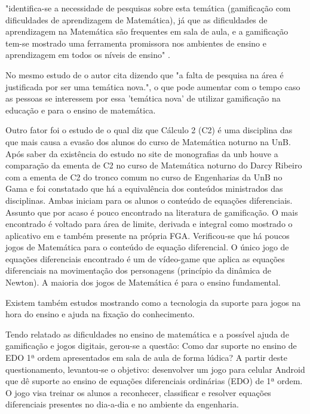 \begin{citacao}"identifica-se a necessidade de pesquisas sobre esta temática (gamificação com dificuldades de aprendizagem de Matemática), já que as dificuldades de aprendizagem na Matemática são frequentes em sala de aula, e a gamificação tem-se mostrado uma ferramenta promissora nos ambientes de ensino e aprendizagem em todos os níveis de ensino" \cite{revbibmatgam}. \end{citacao}

No mesmo estudo de \cite{revbibmatgam} o autor cita \cite{dicheva} dizendo que "a falta de pesquisa na área é justificada por ser uma temática nova.", o que pode aumentar com o tempo caso as pessoas se interessem por essa 'temática nova' de utilizar gamificação na educação e para o ensino de matemática.


Outro fator foi o estudo de \cite{evasaoC2} o qual diz que Cálculo 2 (C2) é uma disciplina das que mais causa a evasão dos alunos do curso de Matemática noturno na UnB. Após saber da existência do estudo no site de monografias da unb houve a comparação da ementa de C2 no curso de Matemática noturno do Darcy Ribeiro com a ementa de C2 do tronco comum no curso de Engenharias da UnB no Gama e foi constatado que há a equivalência dos conteúdos ministrados das disciplinas. Ambas iniciam para os alunos o conteúdo de equações diferenciais. Assunto que por acaso é pouco encontrado na literatura de gamificação. O mais encontrado é voltado para área de limite, derivada e integral como mostrado o aplicativo em \cite{appcalculo} e também presente na própria FGA. Verificou-se que há poucos jogos de Matemática para o conteúdo de equação diferencial. O único jogo de equações diferenciais encontrado é um de vídeo-game que aplica as equações diferenciais na movimentação dos personagens (princípio da dinâmica de Newton)\cite{videoGameED}. A maioria dos jogos de Matemática é para o ensino fundamental.


Existem também estudos mostrando como a tecnologia da suporte para jogos na hora do ensino e ajuda na fixação do conhecimento. 

Tendo relatado as dificuldades no ensino de matemática e a possível ajuda de gamificação e jogos digitais, gerou-se a questão: Como dar suporte no ensino de EDO 1ª ordem apresentados em sala de aula de forma lúdica? A partir deste questionamento, levantou-se o objetivo: desenvolver um jogo para celular Android que dê suporte ao ensino de equações diferenciais ordinárias (EDO) de 1ª ordem. O jogo visa treinar os alunos a reconhecer, classificar e resolver equações diferenciais presentes no dia-a-dia e no ambiente da engenharia.

